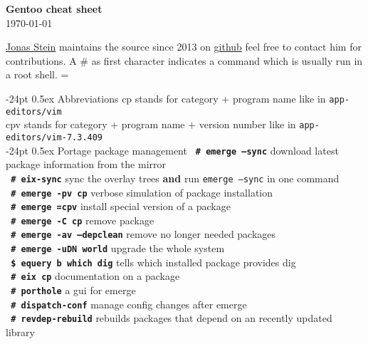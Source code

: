 \documentclass[landscape]{article}
\makeatletter
\renewcommand\section{\@startsection{section}{1}{0mm}%
                                     {-24pt}%
                                     {0.5ex}%
                                {\color{black}\normalfont\large\bfseries}}
\newcommand{\code}{\texttt}
\newcommand{\bcode}[1]{\texttt{\textbf{\color{blue} #1}}}
\newcommand{\asroot}{\# }
\newcommand{\asuser}{\$ }
\newcommand{\cp}{{\color{blue}cp}\xspace}
\newcommand{\cpv}{{\color{blue}cpv}\xspace}
\makeatother
\begin{document}
\footnotesize
\begin{multicols*}{2}

\setlength{\premulticols}{1pt}
\setlength{\postmulticols}{1pt}
\setlength{\multicolsep}{1pt}
\setlength{\columnsep}{2pt}

\begin{center}
     {\Large{\textbf{\color{black}Gentoo cheat sheet}}} \\
 \today
\end{center}
\href{mailto:news@jonasstein.de}{Jonas Stein} maintains 
the source since 2013 on \href{https://github.com/jonasstein/gentoo-cheat}{github} feel free to contact him for contributions. A \asroot as first character indicates a command which is usually run in a root shell. 
\everypar={\hangindent=9mm}

\section{Abbreviations}
\cp stands for category + program name like in \code{app-editors/vim}\\
\cpv stands for category + program name + version number like in \code{app-editors/vim-7.3.409}\\

\section{Portage package management}
\bcode{\asroot emerge --sync} download latest package information from the mirror\\
\bcode{\asroot eix-sync} sync the overlay trees \textbf{and} run \code{emerge --sync} in one command\\
\bcode{\asroot emerge -pv \cp} verbose simulation of package installation\\ 
\bcode{\asroot emerge =cpv} install special version of a package\\ 
\bcode{\asroot emerge -C \cp} remove package\\ 
\bcode{\asroot emerge -av --depclean} remove no longer needed packages\\
\bcode{\asroot emerge -uDN world} upgrade the whole system\\
\bcode{\asuser equery b \textacutedbl which dig\textacutedbl} tells which installed package provides dig\\
\bcode{\asroot eix \cp} documentation on a package\\ %
\bcode{\asroot porthole} a gui for emerge\\
\bcode{\asroot dispatch-conf} manage config changes after emerge\\
\bcode{\asroot revdep-rebuild} rebuilds packages that depend on an recently updated library\\


\end{multicols*}
\end{document}
